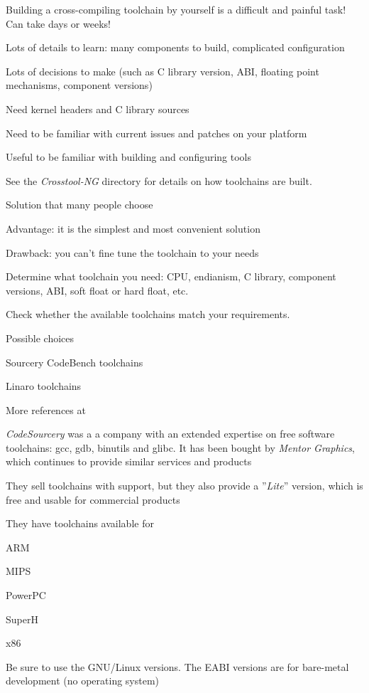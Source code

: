 

  Building a cross-compiling toolchain by yourself is a difficult and painful
  task! Can take days or weeks!
  \startitemize
  \item Lots of details to learn: many components to build, complicated
    configuration
  \item Lots of decisions to make (such as C library version, ABI, floating point
    mechanisms, component versions)
  \item Need kernel headers and C library sources
  \item Need to be familiar with current  issues and patches
    on your platform
  \item Useful to be familiar with building and configuring tools
  \item See the {\em Crosstool-NG}  directory for details
    on how toolchains are built.
\stopitemize

  \startitemize
  \item Solution that many people choose
    \startitemize
    \item Advantage: it is the simplest and most convenient solution
    \item Drawback: you can't fine tune the toolchain to your needs
    \stopitemize
  \item Determine what toolchain you need: CPU, endianism, C library, component
    versions, ABI, soft float or hard float, etc.
  \item Check whether the available toolchains match your requirements.
  \item Possible choices
    \startitemize
    \item Sourcery CodeBench toolchains
    \item Linaro toolchains
    \item More references at 
    \stopitemize
  \stopitemize

  \startitemize
  \item {\em CodeSourcery} was a a company with an extended expertise
    on free software toolchains: gcc, gdb, binutils and glibc. It has
    been bought by {\em Mentor Graphics}, which continues to provide
    similar services and products
  \item They sell toolchains with support, but they also provide a
    ”{\em Lite}” version, which is free and usable for commercial
    products
  \item They have toolchains available for
    \startitemize
    \item ARM
    \item MIPS
    \item PowerPC
    \item SuperH
    \item x86
    \stopitemize
  \item Be sure to use the GNU/Linux versions. The EABI versions are
    for bare-metal development (no operating system)
  \stopitemize

